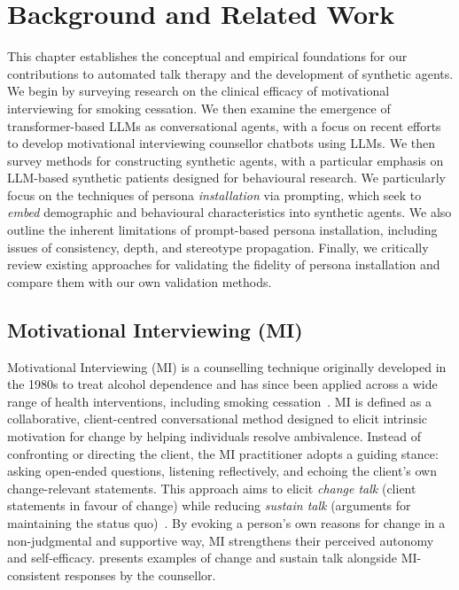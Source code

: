 \chapter{Background and Related Work}
\label{ch:background}
This chapter establishes the conceptual and empirical foundations for our contributions to automated talk therapy and the development of synthetic agents. We begin by surveying research on the clinical efficacy of motivational interviewing for smoking cessation. We then examine the emergence of transformer-based LLMs as conversational agents, with a focus on recent efforts to develop motivational interviewing counsellor chatbots using LLMs. We then survey methods for constructing synthetic agents, with a particular emphasis on LLM-based synthetic patients designed for behavioural research. We particularly focus on the techniques of persona \emph{installation} via prompting, which seek to \emph{embed} demographic and behavioural characteristics into synthetic agents. We also outline the inherent limitations of prompt-based persona installation, including issues of consistency, depth, and stereotype propagation. Finally, we critically review existing approaches for validating the fidelity of persona installation and compare them with our own validation methods.


\section{Motivational Interviewing (MI)}
Motivational Interviewing (MI) is a counselling technique originally developed in the 1980s to treat alcohol dependence and has since been applied across a wide range of health interventions, including smoking cessation~\cite{Miller1983, MillerRollnick2023}. MI is defined as a collaborative, client-centred conversational method designed to elicit intrinsic motivation for change by helping individuals resolve ambivalence. Instead of confronting or directing the client, the MI practitioner adopts a guiding stance: asking open-ended questions, listening reflectively, and echoing the client's own change-relevant statements. This approach aims to elicit \emph{change talk} (client statements in favour of change) while reducing \emph{sustain talk} (arguments for maintaining the status quo)~\cite{MillerRose2009}. By evoking a person's own reasons for change in a non-judgmental and supportive way, MI strengthens their perceived autonomy and self-efficacy.  presents examples of change and sustain talk alongside MI-consistent responses by the counsellor.


